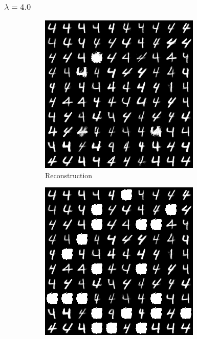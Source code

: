 \documentclass{beamer}
\theoremstyle{plain}
\theoremstyle{definition}
\theoremstyle{remark}
\begin{document}
\begin{frame}
	\frametitle{$\lambda=4.0$}
	\begin{figure}
		\centering
		\begin{subfigure}[b]{0.3\textwidth}
			\centering
			\includegraphics[width=\textwidth]{Images/l21R_4.png}
			\caption{Reconstruction}
		\end{subfigure}
		\hfill
		\begin{subfigure}[b]{0.3\textwidth}
			\centering
			\includegraphics[width=\textwidth]{Images/l21L_4.png}

\end{subfigure}
\end{figure}
\end{frame}
\end{document}
